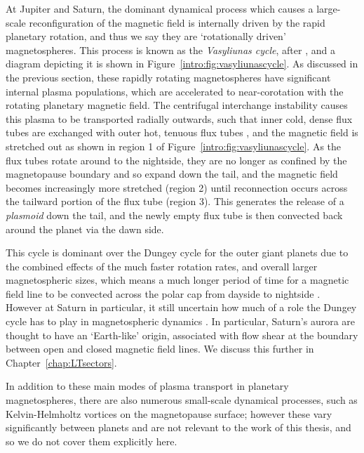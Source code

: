 At Jupiter and Saturn, the dominant dynamical process which causes a large-scale reconfiguration of the magnetic field is internally driven by the rapid planetary rotation, and thus we say they are `rotationally driven' magnetospheres. This process is known as the \textit{Vasyliunas cycle}, after \citet{vasyliunas1983}, and a diagram depicting it is shown in Figure~\ref{intro:fig:vasyliunascycle}. As discussed in the previous section, these rapidly rotating magnetospheres have significant internal plasma populations, which are accelerated to near-corotation with the rotating planetary magnetic field. The centrifugal interchange instability causes this plasma to be transported radially outwards, such that inner cold, dense flux tubes are exchanged with outer hot, tenuous flux tubes \citep{southwood1989}, and the magnetic field is stretched out as shown in region 1 of Figure~\ref{intro:fig:vasyliunascycle}. As the flux tubes rotate around to the nightside, they are no longer as confined by the magnetopause boundary and so expand down the tail, and the magnetic field becomes increasingly more stretched (region 2) until reconnection occurs across the tailward portion of the flux tube (region 3). This generates the release of a \textit{plasmoid} down the tail, and the newly empty flux tube is then convected back around the planet via the dawn side. 

This cycle is dominant over the Dungey cycle for the outer giant planets due to the combined effects of the much faster rotation rates, and overall larger magnetospheric sizes, which means a much longer period of time for a magnetic field line to be convected across the polar cap from dayside to nightside \citep{forsyth2010}. However at Saturn in particular, it still uncertain how much of a role the Dungey cycle has to play in magnetospheric dynamics \citep[e.g.][]{cowley2005}. In particular, Saturn's aurora are thought to have an `Earth-like' origin, associated with flow shear at the boundary between open and closed magnetic field lines. We discuss this further in Chapter~\ref{chap:LTsectors}.

In addition to these main modes of plasma transport in planetary magnetospheres, there are also numerous small-scale dynamical processes, such as Kelvin-Helmholtz vortices on the magnetopause surface; however these vary significantly between planets and are not relevant to the work of this thesis, and so we do not cover them explicitly here.


